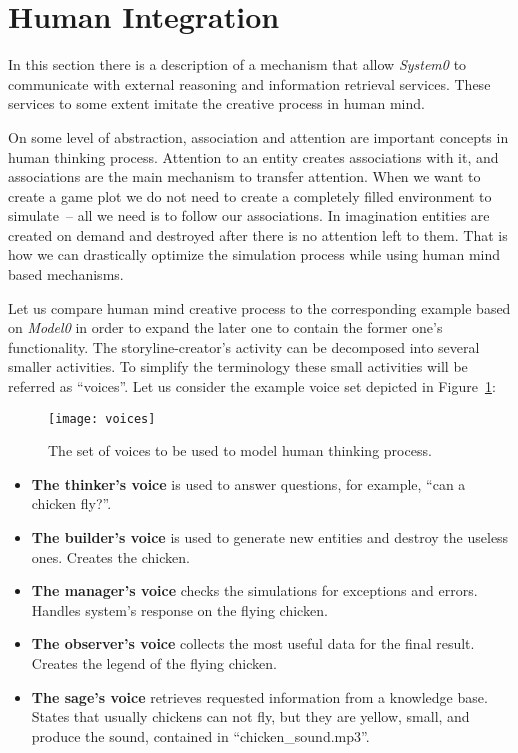 \section{Human Integration}
In this section  there is a description of a mechanism that allow \textit{System0} to communicate with external reasoning and information retrieval services. These services to some extent imitate the creative process in human mind.\par
On some level of abstraction, association and attention are important concepts in human thinking process. Attention to an entity creates associations with it, and associations are the main mechanism to transfer attention. When we want to create a game plot we do not need to create a completely filled environment to simulate~-- all we need is to follow our associations. In imagination entities are created on demand and destroyed after there is no attention left to them. That is how we can drastically optimize the simulation process while using human mind based mechanisms.\par
Let us compare human mind creative process to the corresponding example based on \textit{Model0} in order to expand the later one to contain the former one's functionality.
The storyline-creator's activity can be decomposed into several smaller activities. To simplify the terminology these small activities will be referred as ``voices''. Let us consider the example voice set depicted in Figure~\ref{Voices}:
 \begin{figure}[h!]
    \begin{center}
      \texttt{[image: voices]}
      \caption{The set of voices to be used to model human thinking process.}
      \label{Voices}
     \end{center}
    \end{figure}
\begin{itemize}
\item \textbf{The thinker's voice} is used to answer questions, for example, ``can a chicken fly?''.
\item \textbf{The builder's voice} is used to generate new entities and destroy the useless ones. Creates the chicken.
\item \textbf{The manager's voice} checks the simulations for exceptions and errors. Handles system's response on the flying chicken.
\item \textbf{The observer's voice} collects the most useful data for the final result. Creates the legend of the flying chicken.
\item \textbf{The sage's voice} retrieves requested information from a knowledge base. States that usually chickens can not fly, but they are yellow, small, and produce the sound, contained in ``chicken\_sound.mp3''.
\end{itemize}
